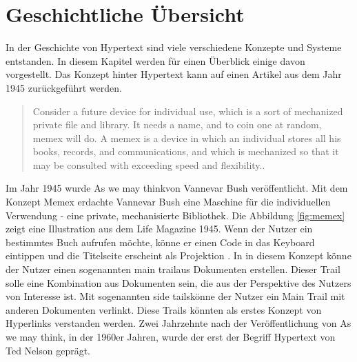 \chapter{Geschichtliche Übersicht}
\label{ch:Geschichtlich}

In der Geschichte von Hypertext sind viele verschiedene Konzepte und Systeme entstanden. In diesem Kapitel werden für einen Überblick einige davon vorgestellt. Das Konzept hinter Hypertext kann auf einen Artikel aus dem Jahr 1945 zurückgeführt werden.

\begin{quote}
	\glqq Consider a future device for individual use, which is a sort of mechanized private file and library. It needs a name, and to coin one at random, memex will do. A memex is a device in which an individual stores all his books, records, and communications, and which is mechanized so that it may be consulted with exceeding speed and flexibility.\grqq{ }\cite[Section 6]{Bush1945}.
\end{quote}

Im Jahr 1945 wurde \glqq As we may think\grqq{ }von Vannevar Bush veröffentlicht. Mit dem Konzept \glqq Memex\grqq{ } erdachte Vannevar Bush eine Maschine für die individuellen Verwendung - eine private, mechanisierte Bibliothek. Die Abbildung \ref{fig:memex} zeigt eine Illustration aus dem Life Magazine 1945. Wenn der Nutzer ein bestimmtes Buch aufrufen möchte, könne er einen Code in das Keyboard eintippen und die Titelseite erscheint als Projektion \cite[S.121]{Life1945} \cite[Section 6]{Bush1945}. In in diesem Konzept könne der Nutzer einen sogenannten \glqq main trail\grqq{ }aus Dokumenten erstellen. Dieser Trail solle eine Kombination aus Dokumenten sein, die aus der Perspektive des Nutzers von Interesse ist. Mit sogenannten \glqq side tails\grqq{ }könne der Nutzer ein Main Trail mit anderen Dokumenten \glqq verlinkt\grqq{ }\cite[Section 7]{Bush1945}. Diese Trails könnten als erstes Konzept von Hyperlinks verstanden werden. Zwei Jahrzehnte nach der Veröffentlichung von \glqq As we may think\grqq{ }, in der 1960er Jahren, wurde der erst der Begriff Hypertext von Ted Nelson geprägt. 

